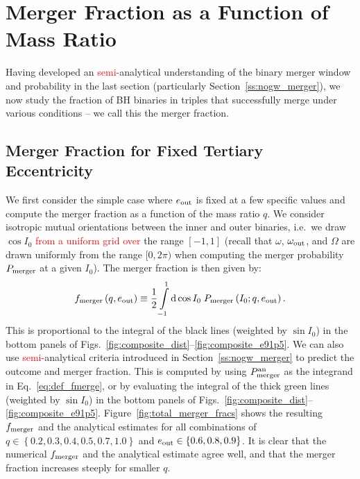 \documentclass[
        fleqn,
        usenatbib,
    ]{mnras}
\newcommand*{\p}[1]{\left(#1\right)}
\newcommand*{\z}[1]{\left\{#1\right\}}
\begin{document}
\section{Merger Fraction as a Function of Mass Ratio}\label{s:merger_frac}

Having developed an \textcolor{red}{semi-}analytical understanding of the binary
merger window and probability in the last section (particularly
Section~\ref{ss:nogw_merger}), we now study the fraction of BH binaries in
triples that successfully merge under various conditions -- we %
call this the merger fraction.

\subsection{Merger Fraction for Fixed Tertiary Eccentricity}

We first consider the simple case where $e_{\rm out}$ is fixed at a few
specific values and compute the merger fraction as a function of the mass ratio
$q$. We consider isotropic mutual orientations between the inner and outer
binaries, i.e.\ we draw $\cos I_0$ \textcolor{red}{from a uniform grid over} the
range $[-1, 1]$ (recall that $\omega$, $\omega_{\rm out}$, and $\Omega$ are
drawn uniformly from the range $[0, 2\pi)$ %
when computing the merger probability $P_{\rm merger}$ at a given $I_0$). The
merger fraction is then given by:
\begin{align}
    f_{\rm merger}\p{q, e_{\rm out}} \equiv
        \frac{1}{2}\int\limits_{-1}^1\mathrm{d}\cos I_0\;
            P_{\rm merger}\p{I_0; q, e_{\rm out}} .\label{eq:def_fmerge}
\end{align}
This is proportional to the integral of the black lines (weighted by $\sin I_0$)
in the bottom panels of
Figs.~\ref{fig:composite_dist}--\ref{fig:composite_e91p5}. We can also use
\textcolor{red}{semi-}analytical criteria introduced in
Section~\ref{ss:nogw_merger} to predict the outcome and merger fraction. This is
computed by using $P_{\rm merger}^{\rm an}$ as the integrand in
Eq.~\eqref{eq:def_fmerge}, or by evaluating the integral of the thick green
lines (weighted by $\sin I_0$) in the bottom panels of
Figs.~\ref{fig:composite_dist}--\ref{fig:composite_e91p5}.
Figure~\ref{fig:total_merger_fracs} shows the resulting $f_{\rm merger}$ and the
analytical estimates for all combinations of $q \in \z{0.2, 0.3, 0.4, 0.5, 0.7,
1.0}$ and $e_{\rm out} \in \z{0.6, 0.8, 0.9}$. It is clear that the numerical
$f_{\rm merger}$ and the analytical estimate agree well, and that the merger
fraction increases steeply for smaller $q$.
\end{document}
